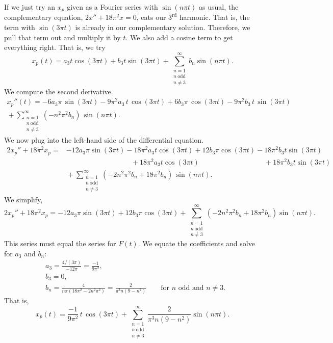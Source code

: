 \begin{example}
If we just try an $x_p$ given as a Fourier series with $\sin (n\pi t)$ as usual,
the complementary equation, $2x''+18\pi^2x=0$, eats our $3^\text{rd}$ harmonic.  That is, the term
with $\sin(3 \pi t)$
is already
in our complementary solution.
Therefore, we pull that term out and
multiply it by $t$.  We also add a cosine term to get everything right.
That is, we try
\begin{equation*}
x_p(t) =
a_3
t \cos (3 \pi t )
+
b_3
t \sin (3 \pi t)
+
\sum_{\substack{n=1 \\ n~\text{odd} \\ n \neq 3}}^\infty
b_n
\sin (n \pi t) . 
\end{equation*}
We compute the second derivative.
\begin{multline*}
x_p''(t) =
- 6 a_3
\pi \, \sin (3 \pi t) - 9\pi^2 a_3 \, t \, \cos (3 \pi t)
+
6 b_3
\pi \, \cos (3 \pi t) - 9\pi^2 b_3 \, t \, \sin (3 \pi t)
\\
{} +
\sum_{\substack{n=1 \\ n~\text{odd} \\ n \neq 3}}^\infty
(-n^2 \pi^2 b_n ) \,
\sin (n \pi t) . 
\end{multline*}
We now plug into the left-hand side of the differential equation.
\begin{align*}
2x_p'' + 18\pi^2 x_p 
= & 
- 12 a_3 \pi \sin (3 \pi t)
- 18\pi^2 a_3 t \cos (3 \pi t)
+ 12 b_3 \pi \cos (3 \pi t)
- 18\pi^2 b_3 t \sin (3 \pi t)
\\
& \phantom{\, - 12 a_3 \pi \sin (3 \pi t)} ~
{} + 18 \pi^2 a_3 t \cos (3 \pi t)
\phantom{\, + 12 b_3 \pi \cos (3 \pi t)} ~
{} + 18 \pi^2 b_3 t \sin (3 \pi t)
\\
& {} + \sum_{\substack{n=1 \\ n~\text{odd} \\ n \neq 3}}^\infty
(-2n^2 \pi^2 b_n + 18\pi^2 b_n) \,
\sin (n \pi t) . 
\end{align*}
We simplify,
\begin{equation*}
2x_p'' + 18\pi^2 x_p =
- 12 a_3
\pi \sin (3 \pi t)
+
12 b_3
\pi \cos (3 \pi t)
+
\sum_{\substack{n=1 \\ n~\text{odd} \\ n \neq 3}}^\infty
(-2n^2 \pi^2 b_n + 18\pi^2 b_n)
\sin (n \pi t) . 
\end{equation*}
This series must equal the series for $F(t)$.
We equate the coefficients and solve for $a_3$ and $b_n$:
\begin{align*}
& a_3 = \frac{4/(3\pi)}{-12\pi} = \frac{-1}{9\pi^2} , \\
& b_3 = 0 , \\
& b_n = \frac{4}{n\pi(18\pi^2 - 2n^2 \pi^2)} 
= \frac{2}{\pi^3 n(9 - n^2)} \qquad \text{for } n \text{ odd and } n \neq 3 .
\end{align*}
That is,
\begin{equation*}
x_p(t) =
\frac{-1}{9\pi^2}
\,
t \, \cos (3 \pi t)
+
\sum_{\substack{n=1 \\ n~\text{odd} \\ n \neq 3}}^\infty
\frac{2}{\pi^3 n(9 - n^2)}
\sin (n \pi t) . 
\end{equation*}
\end{example}


